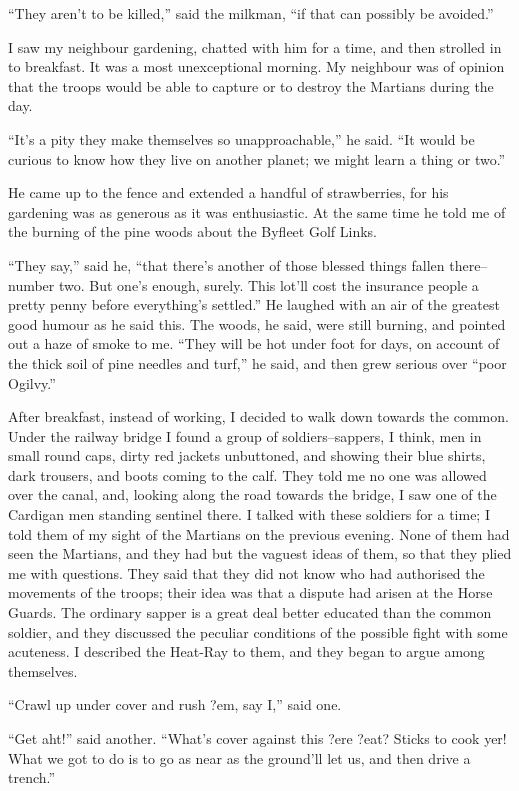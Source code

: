 ``They aren't to be killed,'' said the milkman, ``if that can possibly
be avoided.''

I saw my neighbour gardening, chatted with him for a time, and then
strolled in to breakfast. It was a most unexceptional morning. My
neighbour was of opinion that the troops would be able to capture
or to destroy the Martians during the day.

``It's a pity they make themselves so unapproachable,'' he said. ``It
would be curious to know how they live on another planet; we might
learn a thing or two.''

He came up to the fence and extended a handful of strawberries, for
his gardening was as generous as it was enthusiastic. At the same
time he told me of the burning of the pine woods about the Byfleet
Golf Links.

``They say,'' said he, ``that there's another of those blessed things
fallen there--number two. But one's enough, surely. This lot'll
cost the insurance people a pretty penny before everything's
settled.'' He laughed with an air of the greatest good humour as he
said this. The woods, he said, were still burning, and pointed out
a haze of smoke to me. ``They will be hot under foot for days, on
account of the thick soil of pine needles and turf,'' he said, and
then grew serious over ``poor Ogilvy.''

After breakfast, instead of working, I decided to walk down towards
the common. Under the railway bridge I found a group of
soldiers--sappers, I think, men in small round caps, dirty red
jackets unbuttoned, and showing their blue shirts, dark trousers,
and boots coming to the calf. They told me no one was allowed over
the canal, and, looking along the road towards the bridge, I saw
one of the Cardigan men standing sentinel there. I talked with
these soldiers for a time; I told them of my sight of the Martians
on the previous evening. None of them had seen the Martians, and
they had but the vaguest ideas of them, so that they plied me with
questions. They said that they did not know who had authorised the
movements of the troops; their idea was that a dispute had arisen
at the Horse Guards. The ordinary sapper is a great deal better
educated than the common soldier, and they discussed the peculiar
conditions of the possible fight with some acuteness. I described
the Heat-Ray to them, and they began to argue among themselves.

``Crawl up under cover and rush ?em, say I,'' said one.

``Get aht!'' said another. ``What's cover against this ?ere ?eat?
Sticks to cook yer! What we got to do is to go as near as the
ground'll let us, and then drive a trench.''

